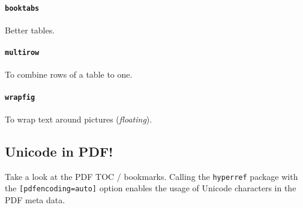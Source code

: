 \paragraph{\texttt{booktabs}} %
\label{par:booktabs}
Better tables.
\paragraph{\texttt{multirow}} %
\label{par:multirow}
To combine rows of a table to one.
\paragraph{\texttt{wrapfig}} %
\label{par:wrapfig}
To wrap text around pictures (\emph{floating}).
\subsection{\texorpdfstring{Unicode in PDF!}{Unicode: A⁺ → B⁻ π⁺}} %
\label{sub:unicode_in_pdf_}
Take a look at the PDF TOC / bookmarks. Calling the \texttt{hyperref} package with the \texttt{[pdfencoding=auto]} option enables the usage of Unicode characters in the PDF meta data.

